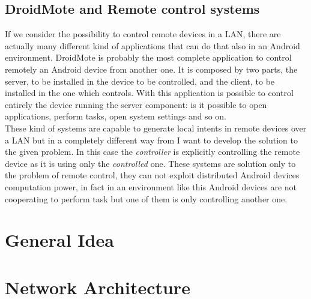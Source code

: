 \subsection{DroidMote and Remote control systems }
If we consider the possibility to control remote devices in a LAN, there are actually many different kind of applications that can do that also in an Android environment.
DroidMote is probably the most complete application to control remotely an Android device from another one. It is composed by two parts, the server, to be installed in the device to be controlled, and the client, to be installed in the one which controls. With this application is possible to control entirely the device running the server component: is it possible to open applications, perform tasks, open system settings and so on.\\
These kind of systems are capable to generate local intents in remote devices over a LAN but in a completely different way from I want to develop the solution to the given problem. In this case the \textit{controller} is explicitly controlling the remote device as it is using only the \textit{controlled} one. These systems are solution only to the problem of remote control, they can not exploit distributed Android devices computation power, in fact in an environment like this Android devices are not cooperating to perform task but one of them is only controlling another one.
\section{General Idea}

\section{Network Architecture}


%
